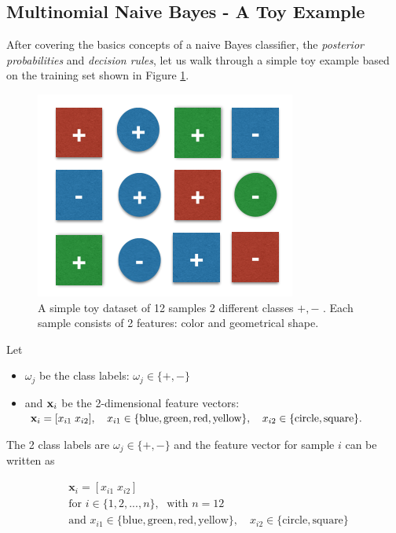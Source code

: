 \documentclass{article}
\begin{document}
\subsection{Multinomial Naive Bayes - A Toy Example}
\label{sec:multinomial_naive_bayes-a_toy_example}

After covering the basics concepts of a naive Bayes classifier, the \emph{posterior probabilities} and \emph{decision rules}, let us walk through a simple toy example based on the training set shown in Figure \ref{fig:toy_dataset}.

\begin{figure}[h!]
\includegraphics[scale=0.5]{../images/toy_dataset_1.png}
\caption{A simple toy dataset of 12 samples 2 different classes $+, -$  . Each sample consists of 2 features: color and geometrical shape.}
\label{fig:toy_dataset}
\end{figure}

Let

\begin{itemize}
	\item $\omega_j$ be the class labels: $\omega_j \in \{+, -\}$
	\item and $\textbf x_i$  be the 2-dimensional feature vectors: $\textbf x_i = [x_{i1} \; x_{i2}], \quad x_{i1} \in \{ \text{blue}, \text{green}, \text{red}, \text{yellow} \}, \quad x_{i2} \in \{\text{circle}, \text{square} \}.$
\end{itemize}

The 2 class labels are $\omega_j \in \{+, -\}$ and the feature vector for sample $i$ can be written as

\begin{equation}
\begin{split}
& \textbf{x}_i = [x_{i1} \; x_{i2}] \\ 
& \text{for } i \in \{1, 2, ...,  n\}, \; \text{ with } n=12 \\
& \text{and } x_{i1} \in \{ \text{blue}, \text{green}, \text{red}, \text{yellow} \}, \quad x_{i2} \in \{\text{circle}, \text{square} \}
\end{split}
\end{equation}
 
\end{document}

